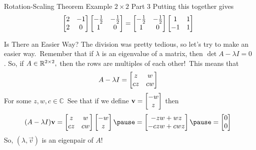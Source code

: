 \documentclass[xcoler=dvipsnames, aspectratio=169]{beamer}
\newcommand{\C}{\mathbb{C}}
\begin{document}
    \begin{frame}{Rotation-Scaling Theorem Example $2\times 2$ Part 3}
        Putting this together gives\pause
        \[
            \begin{bmatrix}
                2 & -1 \\
                2 & 0
            \end{bmatrix}\begin{bmatrix}
                -\frac{1}{2} & -\frac{1}{2}\\
                1 & 0
            \end{bmatrix} = \begin{bmatrix}
                -\frac{1}{2} & -\frac{1}{2}\\
                1 & 0
            \end{bmatrix}\begin{bmatrix}
                1 & 1\\
                -1& 1
            \end{bmatrix}
        \]
    \end{frame}
    \begin{frame}{Is There an Easier Way?}
        The division was pretty tedious, so let's try to make an easier way.\pause\
        Remember that if $\lambda$ is an eigenvalue of a matrix, then $\det{A-\lambda I} = 0$. So, if
        $A\in\mathbb{R}^{2\times 2},$ then the rows are multiples of each other!\pause\ This means that
        \[
            A - \lambda I = \begin{bmatrix}
                z & w\\
                cz&cw
            \end{bmatrix}
        \]
        For some $z,w,c\in\C$\pause\
        See that if we define $\mathbf{v} = \begin{bmatrix}-w\\z\end{bmatrix}$ then\pause\
        \[
            (A-\lambda I)\vec{v} = \bMat{
                z & w\\
                cz&cw
            }\bMat{-w\\z}\pause = \bMat{
                -zw + wz\\
                -czw+cwz
            }\pause = \bMat{
                0\\
                0
            }
        \]\pause
        So, $(\lambda,\vec{v})$ is an eigenpair of $A$!
    \end{frame}
\end{document}
